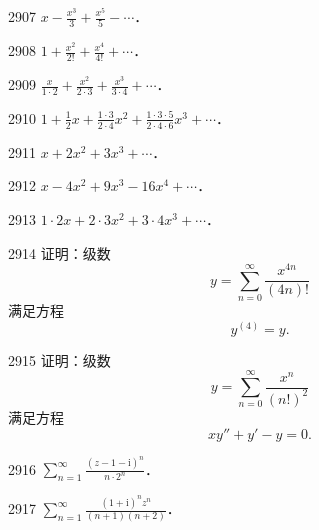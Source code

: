 \begin{prob}[S]{2907}
$\displaystyle x - \frac{x^3}{3} + \frac{x^5}{5} - \cdots$．
\end{prob}

\begin{prob}[S]{2908}
$\displaystyle 1 + \frac{x^2}{2!} + \frac{x^4}{4!} + \cdots$．
\end{prob}

\begin{prob}[S]{2909}
$\displaystyle \frac{x}{1 \cdot 2} + \frac{x^2}{2 \cdot 3} + \frac{x^3}{3 \cdot 4} + \cdots$．
\end{prob}

\begin{prob}[S]{2910}
$\displaystyle 1 + \frac{1}{2} x + \frac{1 \cdot 3}{2 \cdot 4} x^2 + \frac{1 \cdot 3 \cdot 5}{2 \cdot 4 \cdot 6} x^3 + \cdots$．
\end{prob}


\begin{prob}[S]{2911}
$x + 2x^2 + 3x^3 + \cdots$．
\end{prob}

\begin{prob}[S]{2912}
$x - 4x^2 + 9x^3 - 16x^4 + \cdots$．
\end{prob}

\begin{prob}[S]{2913}
$1 \cdot 2x + 2 \cdot 3x^2 + 3 \cdot 4x^3 + \cdots$．
\end{prob}

\begin{prob}[M]{2914}
证明：级数
\[
y = \sum_{n=0}^{\infty} \frac{x^{4n}}{(4n)!}
\]
满足方程
\[
y^{(4)} = y.
\]
\end{prob}

\begin{prob}[M]{2915}
证明：级数
\[
y = \sum_{n=0}^{\infty} \frac{x^n}{(n!)^2}
\]
满足方程
\[
x y'' + y' - y = 0.
\]
\end{prob}


\begin{prob}[S]{2916}
$\displaystyle \sum_{n=1}^{\infty} \frac{(z - 1 - \mathrm{i})^n}{n \cdot 2^n}$．
\end{prob}

\begin{prob}[S]{2917}
$\displaystyle \sum_{n=1}^{\infty} \frac{(1 + \mathrm{i})^n z^n}{(n + 1)(n + 2)}$．
\end{prob}

